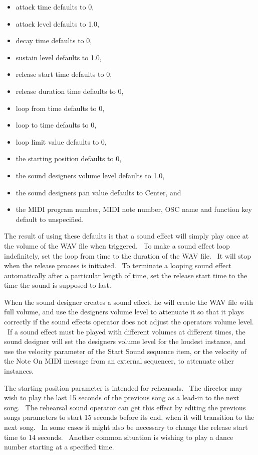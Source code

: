 \documentclass[letterpaper]{article}
\newcommand\liststyleLxiv{%
\renewcommand\labelitemi{•}
\renewcommand\labelitemii{◦}
\renewcommand\labelitemiii{${\blacksquare}$}
\renewcommand\labelitemiv{•}
}
\begin{document}
\liststyleLxiv
\begin{itemize}
\item attack time defaults to 0,
\item attack level defaults to 1.0,
\item decay time defaults to 0,
\item sustain level defaults to 1.0,
\item release start time defaults to 0,
\item release duration time defaults to 0,
\item loop from time defaults to 0,
\item loop to time defaults to 0,
\item loop limit value defaults to 0,
\item the starting position defaults to 0,
\item the sound designer{\textquotesingle}s volume level defaults to
1.0, 
\item the sound designer{\textquotesingle}s pan value defaults to
Center, and
\item the MIDI program number, MIDI note number, OSC name and function
key default to unspecified.
\end{itemize}
The result of using these defaults is that a sound effect will simply
play once at the volume of the WAV file when triggered. \ To make a
sound effect loop indefinitely, set the loop from time to the duration
of the WAV file. \ It will stop when the release process is initiated.
\ To terminate a looping sound effect automatically after a particular
length of time, set the release start time to the time the sound is
supposed to last. \ 

When the sound designer creates a sound effect, he will create the WAV
file with full volume, and use the designer{\textquotesingle}s volume
level to attenuate it so that it plays correctly if the sound effects
operator does not adjust the operator{\textquotesingle}s volume level.
\ If a sound effect must be played with different volumes at different
times, the sound designer will set the designer{\textquotesingle}s
volume level for the loudest instance, and use the velocity parameter
of the Start Sound sequence item, or the velocity of the Note On MIDI
message from an external sequencer, to attenuate other instances.

The starting position parameter is intended for rehearsals. \ The
director may wish to play the last 15 seconds of the previous song as a
lead-in to the next song. \ The rehearsal sound operator can get this
effect by editing the previous song{\textquotesingle}s parameters to
start 15 seconds before its end, when it will transition to the next
song. \ In some cases it might also be necessary to change the release
start time to 14 seconds. \ Another common situation is wishing to play
a dance number starting at a specified time.
\end{document}
